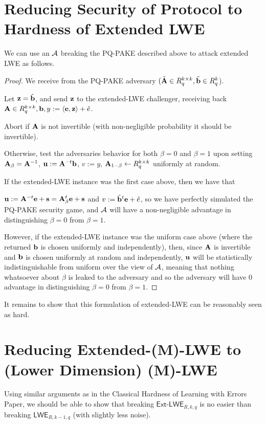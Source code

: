 \documentclass[oribibl,envcountsect,envcountsame]{llncs}
\begin{document}
\section{Reducing Security of Protocol to Hardness of Extended LWE}
\label{sec:proof-ext-lw}

We can use an $\mathcal{A}$ breaking the PQ-PAKE described above to attack extended LWE as follows. 


\begin{proof}We receive from the PQ-PAKE adversary $(\tilde{\mathbf{A}} \in R_q^{k \times k}, \tilde{\mathbf{b}} \in R_q^{k}$). 


Let $\mathbf{z} = \tilde{\mathbf{b}}$, and send $\mathbf{z}$ to the extended-LWE challenger, 
receiving back $\mathbf{A} \in R_q^{k \times k}, \mathbf{b}, y := \langle\mathbf{e}, \mathbf{z}\rangle+\hat{e}$. 

Abort if $\mathbf{A}$ is not invertible (with non-negligible probability it should be invertible).


Otherwise, test the adversaries behavior for both $\beta=0$ and $\beta=1$ upon setting
$\mathbf{A}_{\beta} = \mathbf{A}^{-1}$, $\mathbf{u} := \mathbf{A}^{-t}\mathbf{b}$, $v := y$,
$\mathbf{A}_{1-\beta} \gets R_q^{k \times k}$ uniformly at random.


If the extended-LWE instance was the first case above, then we have that 

$\mathbf{u} := \mathbf{A}^{-t}\mathbf{e}+\mathbf{s} = \mathbf{A}_{\beta}^{t}\mathbf{e}+\mathbf{s}$ and 
$v := \tilde{\mathbf{b}}^t\mathbf{e} + \hat{e}$, so we have perfectly simulated the PQ-PAKE security game, 
and $\mathcal{A}$ will have a non-negligible advantage in distinguishing $\beta=0$ from $\beta=1$. 


However, if the extended-LWE instance was the uniform case above (where the returned $\mathbf{b}$ is 
chosen uniformly and independently), then, since $\mathbf{A}$ is invertible and $\mathbf{b}$ is
chosen uniformly at random and independently, $\mathbf{u}$ will be statistically 
indistinguishable from uniform over the view of $\mathcal{A}$, meaning that nothing whatsoever about 
$\beta$ is leaked to the adversary and so the adversary will have 0 advantage in 
distinguishing $\beta=0$ from $\beta=1$. 
\end{proof}

It remains to show that this formulation of extended-LWE can be reasonably seen as hard. 

\section{Reducing Extended-(M)-LWE to (Lower Dimension) (M)-LWE}
\label{sec:red-ext-lwe-lwe}
Using similar arguments as in the Classical Hardness of Learning with Errors Paper, we should 
be able to show that breaking $\textsf{Ext-LWE}_{R,k,q}$ is no easier than breaking 
$\textsf{LWE}_{R,k-1,q}$ (with slightly less noise).
\end{document}
